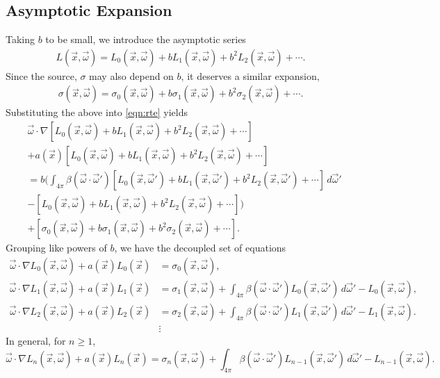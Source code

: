 \subsection{Asymptotic Expansion}
Taking $b$ to be small, we introduce the asymptotic series
\newcommand{\Lasym}{L_0(\vec{x},\vec{\omega}) + b L_1(\vec{x},\vec{\omega}) + b^2 L_2(\vec{x},\vec{\omega}) + \cdots}
\newcommand{\Lasyms}{L_0(\vec{x_s},\vec{\omega}) + b L_1(\vec{x_s},\vec{\omega}) + b^2 L_2(\vec{x_s},\vec{\omega}) + \cdots}
\newcommand{\Lasymb}{L_0(\vec{x_b},\vec{\omega}) + b L_1(\vec{x_b},\vec{\omega}) + b^2 L_2(\vec{x_b},\vec{\omega}) + \cdots}
\newcommand{\Lasymp}{L_0(\vec{x},\vec{\omega}') + b L_1(\vec{x},\vec{\omega}') + b^2 L_2(\vec{x},\vec{\omega}') + \cdots}
\newcommand{\sigasym}{\sigma_0(\vec{x},\vec{\omega}) + b \sigma_1(\vec{x},\vec{\omega}) + b^2 \sigma_2(\vec{x},\vec{\omega}) + \cdots}
\begin{align*}
  L(\vec{x},\vec{\omega}) = \Lasym.
\end{align*}
Since the source, $\sigma$ may also depend on $b$, it deserves a similar expansion,
\begin{align*}
  \sigma(\vec{x},\vec{\omega}) = \sigasym.
\end{align*}
Substituting the above into \eqref{eqn:rte} yields
\begin{align*}
    &\vec{\omega} \cdot \nabla \left[ \Lasym \right] \\
    &+ a(\vec{x}) \left[ \Lasym \right] \\
    &= b\Bigg(
      \int_{4\pi} \beta(\vec{\omega}\cdot\vec{\omega}')
      \left[ \Lasymp \right] \, d\vec{\omega}' \\
    &- \left[ \Lasym \right]
      \Bigg) \\
    &+ \left[ \sigasym \right].
\end{align*}
Grouping like powers of $b$, we have the decoupled set of equations
\begin{align}
  \vec{\omega} \cdot \nabla L_0(\vec{x}, \vec{\omega}) + a(\vec{x})L_0(\vec{x}) &= \sigma_0(\vec{x}, \vec{\omega}),
  \label{eqn:asymptotics_0}\\
  \vec{\omega} \cdot \nabla L_1(\vec{x}, \vec{\omega}) + a(\vec{x})L_1(\vec{x})
  &= \sigma_1(\vec{x}, \vec{\omega})
  + \int_{4\pi} \beta(\vec{\omega}\cdot\vec{\omega}') L_0(\vec{x}, \vec{\omega}')\,d\vec{\omega}' - L_0(\vec{x}, \vec{\omega}), \nonumber\\
  \vec{\omega} \cdot \nabla L_2(\vec{x}, \vec{\omega}) + a(\vec{x})L_2(\vec{x})
  &= \sigma_2(\vec{x}, \vec{\omega})
  + \int_{4\pi} \beta(\vec{\omega}\cdot\vec{\omega}') L_1(\vec{x}, \vec{\omega}')\,d\vec{\omega}' - L_1(\vec{x}, \vec{\omega}). \nonumber \\
  &\vdots \nonumber
\end{align}
In general, for $n \geq 1$,
\begin{equation}
  \vec{\omega} \cdot \nabla L_n(\vec{x}, \vec{\omega}) + a(\vec{x})L_n(\vec{x})
  = \sigma_n(\vec{x}, \vec{\omega})
  + \int_{4\pi} \beta(\vec{\omega}\cdot\vec{\omega}') L_{n-1}(\vec{x}, \vec{\omega}')\,d\vec{\omega}' - L_{n-1}(\vec{x}, \vec{\omega}).
  \label{eqn:asymptotics_n}
\end{equation}

